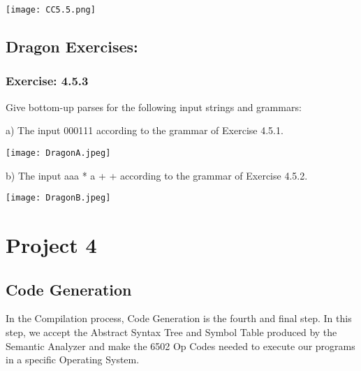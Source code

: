 \documentclass[letterpaper, 10pt,DIV=13]{scrartcl}
\numberwithin{equation}{section} %
\numberwithin{figure}{section} %
\numberwithin{table}{section} %
\begin{document}
\begin{center}
        \texttt{[image: CC5.5.png]}
\end{center}

\pagebreak

\subsection*{Dragon Exercises:}

\subsubsection*{Exercise: 4.5.3}
Give bottom-up parses for the following input strings and grammars: \newline

a) The input 000111 according to the grammar of Exercise 4.5.1.\newline

\begin{center}
        \texttt{[image: DragonA.jpeg]}
\end{center}

b) The input aaa * a + + according to the grammar of Exercise 4.5.2.\newline

\begin{center}
        \texttt{[image: DragonB.jpeg]}
\end{center}





\pagebreak

\section*{Project 4}

\subsection*{Code Generation}
In the Compilation process, Code Generation is the fourth and final step. In this step, we accept the Abstract Syntax Tree and Symbol Table produced by the Semantic Analyzer and make the 6502 Op Codes needed to execute our programs in a specific Operating System.
\end{document}
